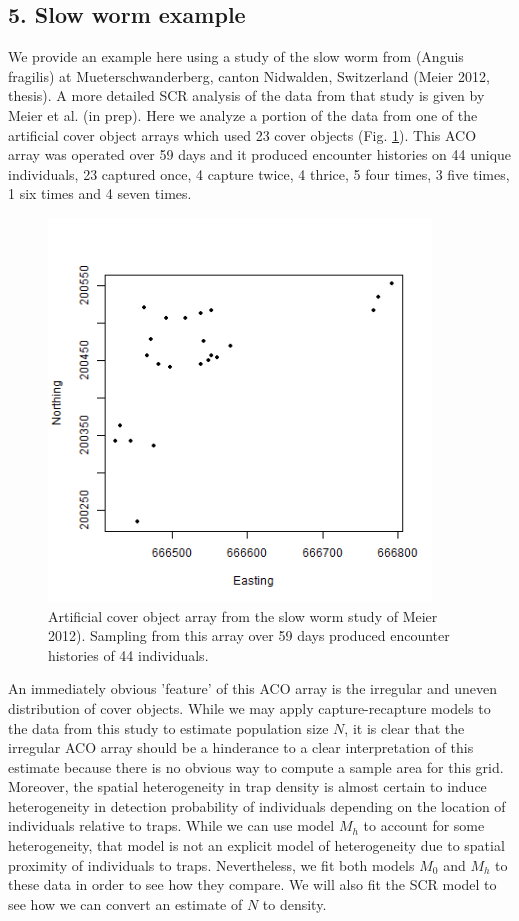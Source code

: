 \documentclass{book}
\begin{document}
\subsection*{5. Slow worm example}

We provide an example here using a study of the slow worm from (Anguis
fragilis) at Mueterschwanderberg, canton Nidwalden, Switzerland (Meier
2012, thesis). A more detailed SCR analysis of the data from that
study is given by Meier et al. (in prep). Here we analyze a portion of
the data from one of the artificial cover object arrays which used 23
cover objects (Fig. \ref{fig.fig1}). This ACO array was operated over 59 days and it
produced encounter histories on 44 unique individuals, 23 captured
once, 4 capture twice, 4 thrice, 5 four times, 3 five times, 1 six
times and 4 seven times.
\begin{figure}[h]
\centering
\includegraphics[height=4in,width=4in]{traps.png}
\caption{
Artificial cover object array from the slow worm study of Meier
2012).  Sampling from this array over 59 days produced encounter
histories of 44 individuals. 
}
\label{fig.fig1}
\end{figure}
An immediately obvious 'feature' of this ACO array is the irregular
and uneven distribution of cover objects.  While we may apply
capture-recapture models to the data from this study to estimate
population size $N$, it is clear that the irregular ACO array should
be a hinderance to a clear interpretation of this estimate because
there is no obvious way to compute a sample area for this
grid. Moreover, the spatial heterogeneity in trap density is almost
certain to induce heterogeneity in detection probability of
individuals depending on the location of individuals relative to
traps. While we can use model $M_h$ to account for some heterogeneity,
that model is not an explicit model of heterogeneity due to spatial
proximity of individuals to traps. Nevertheless, we fit both models
$M_0$ and $M_h$ to these data in order to see how they compare.  We
will also fit the SCR model to see how we can convert an estimate of
$N$ to density. 
\end{document}
